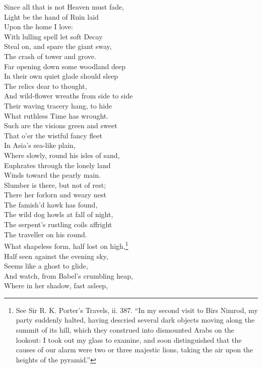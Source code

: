 Since all that is not Heaven must fade, \\
 Light be the hand of Ruin laid \\
 Upon the home I love: \\
 With lulling spell let soft Decay \\
 Steal on, and spare the giant sway, \\
 The crash of tower and grove. \\
  Far opening down some woodland deep \\
 In their own quiet glade should sleep \\
 The relics dear to thought, \\
 And wild-flower wreaths from side to side \\
 Their waving tracery hang, to hide \\
 What ruthless Time has wrought. \\
  Such are the visions green and sweet \\
 That o’er the wistful fancy fleet \\
 In Asia’s sea-like plain, \\
 Where slowly, round his isles of sand, \\
 Euphrates through the lonely land \\
 Winds toward the pearly main. \\
  Slumber is there, but not of rest; \\
 There her forlorn and weary nest \\
 The famish’d hawk has found, \\
 The wild dog howls at fall of night, \\
 The serpent’s rustling coils affright \\
 The traveller on his round. \\
  What shapeless form, half lost on high,\footnote{See Sir R. K. Porter’s Travels, ii. 387. “In my second visit to Birs Nimrod, my party suddenly halted, having descried several dark objects moving along the summit of its hill, which they construed into dismounted Arabs on the lookout: I took out my glass to examine, and soon distinguished that the causes of our alarm were two or three majestic lions, taking the air upon the heights of the pyramid.”} \\
 Half seen against the evening sky, \\
 Seems like a ghost to glide, \\
 And watch, from Babel’s crumbling heap, \\
 Where in her shadow, fast asleep, \\
